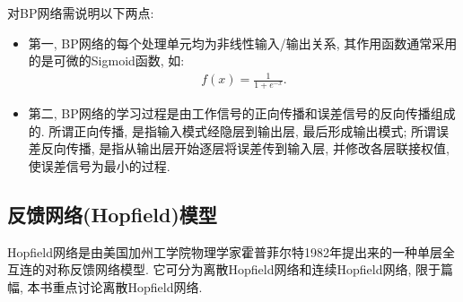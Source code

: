 对BP网络需说明以下两点:
\begin{itemize}
\item 第一, BP网络的每个处理单元均为非线性输入/输出关系, 其作用函数通常采用的是可微的Sigmoid函数, 如:
\begin{align}
  f(x)=\frac{1}{1+e^{-x}}.
\end{align}
\item 第二, BP网络的学习过程是由工作信号的正向传播和误差信号的反向传播组成的. 所谓正向传播, 是指输入模式经隐层到输出层, 最后形成输出模式; 所谓误差反向传播, 是指从输出层开始逐层将误差传到输入层, 并修改各层联接权值, 使误差信号为最小的过程.
\end{itemize}
\subsection{反馈网络(Hopfield)模型}
Hopfield网络是由美国加州工学院物理学家霍普菲尔特1982年提出来的一种单层全互连的对称反馈网络模型. 它可分为离散Hopfield网络和连续Hopfield网络, 限于篇幅, 本书重点讨论离散Hopfield网络.
